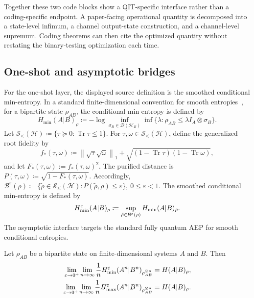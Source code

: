 \documentclass[10pt,a4paper]{article}
\begin{document}
Together these two code blocks show a QIT-specific interface rather than a
coding-specific endpoint.  A paper-facing operational quantity is decomposed
into a state-level infimum, a channel output-state construction, and a
channel-level supremum.  Coding theorems can then cite the optimized quantity
without restating the binary-testing optimization each time.

\subsection{One-shot and asymptotic bridges}
\label{subsec:smooth-asymptotic}
	
For the one-shot layer, the displayed source definition is the smoothed
conditional min-entropy.  In a standard finite-dimensional convention for
smooth entropies~\cite{Renner2005,Tomamichel2015}, for a bipartite state
$\rho_{AB}$, the conditional min-entropy is defined by
\begin{equation}
        H_{\min}(A|B)_\rho
        \coloneqq
        -\log
        \inf_{\sigma_B\in\mathcal D(\mathcal H_B)}
        \inf\{\lambda:\rho_{AB}\le \lambda I_A\otimes\sigma_B\}.
\end{equation}
Let $\mathcal S_{\le}(\mathcal H)\coloneqq \{\tau\succeq 0:\operatorname{Tr}\tau\le 1\}$. For \(\tau,\omega\in\mathcal S_{\le}(\mathcal H)\), define the generalized root fidelity by
\begin{equation}
f_*(\tau,\omega)\coloneqq \left\|\sqrt{\tau}\sqrt{\omega}\right\|_1 + \sqrt{(1-\operatorname{Tr}\tau)(1-\operatorname{Tr}\omega)},
\end{equation}
and let \(F_*(\tau,\omega):=f_*(\tau,\omega)^2\). The purified distance is $P(\tau,\omega)\coloneqq\sqrt{1-F_*(\tau,\omega)}$. Accordingly, $\mathcal B^\varepsilon(\rho) \coloneqq \{\widetilde\rho\in\mathcal S_{\le}(\mathcal H): P(\widetilde\rho,\rho)\le\varepsilon\},~0\le\varepsilon<1$.
The smoothed conditional min-entropy is defined by
\begin{equation}
    H_{\min}^{\varepsilon}(A|B)_\rho \coloneqq
    \sup_{\tilde\rho\in\mathcal B^{\varepsilon}(\rho)}
    H_{\min}(A|B)_{\tilde\rho}.
\end{equation}
The asymptotic interface targets the standard fully quantum AEP for smooth conditional entropies.

\begin{theorem}
\label{thm:fully-quantum-aep}
Let $\rho_{AB}$ be a bipartite state on finite-dimensional systems
$A$ and $B$. Then
\begin{align}
    \lim_{\varepsilon\to0^+}\lim_{n\to\infty}
    \frac{1}{n}
    H_{\min}^{\varepsilon}(A^n|B^n)_{\rho_{AB}^{\otimes n}}
    &= H(A|B)_\rho, \\
    \lim_{\varepsilon\to0^+}\lim_{n\to\infty}
    \frac{1}{n}
    H_{\max}^{\varepsilon}(A^n|B^n)_{\rho_{AB}^{\otimes n}}
    &= H(A|B)_\rho .
\end{align}
\end{theorem}
	
\end{document}
